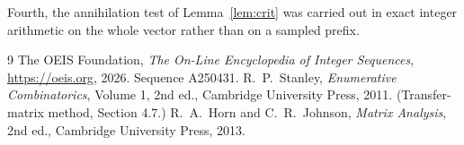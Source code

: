 \documentclass[11pt,a4paper]{article}
\theoremstyle{plain}
\theoremstyle{definition}
\begin{document}
Fourth, the annihilation test of Lemma~\ref{lem:crit} was carried out in exact integer
arithmetic on the whole vector rather than on a sampled prefix.

\begin{thebibliography}{9}
 The OEIS Foundation, \emph{The On-Line Encyclopedia of Integer
Sequences}, \url{https://oeis.org}, 2026. Sequence A250431.
 R.~P.~Stanley, \emph{Enumerative Combinatorics}, Volume 1, 2nd ed.,
Cambridge University Press, 2011. (Transfer-matrix method, Section 4.7.)
 R.~A.~Horn and C.~R.~Johnson, \emph{Matrix Analysis}, 2nd ed., Cambridge
University Press, 2013.
\end{thebibliography}
\end{document}
